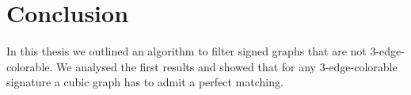 \chapter*{Conclusion}

In this thesis we outlined an algorithm to filter signed graphs that are not 3-edge-colorable. We analysed the first results and showed that for any 3-edge-colorable signature a cubic graph has to admit a perfect matching.
